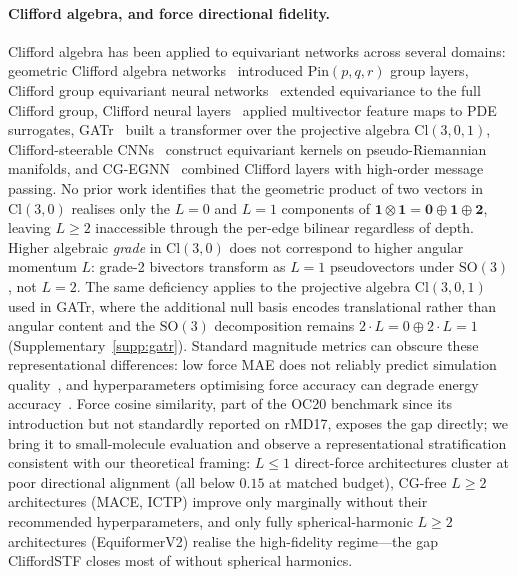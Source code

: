 \paragraph{Clifford algebra, and force directional fidelity.}
Clifford algebra has been applied to equivariant networks across several domains: geometric Clifford algebra networks~\citep{ruhe2023gcan} introduced $\mathrm{Pin}(p,q,r)$ group layers, Clifford group equivariant neural networks~\citep{ruhe2023cgenn} extended equivariance to the full Clifford group, Clifford neural layers~\citep{brandstetter2022clifford} applied multivector feature maps to PDE surrogates, GATr~\citep{brehmer2023geometric} built a transformer over the projective algebra $\mathrm{Cl}(3,0,1)$, Clifford-steerable CNNs~\citep{zhdanov2024clifford} construct equivariant kernels on pseudo-Riemannian manifolds, and CG-EGNN~\citep{tran2024cgegnn} combined Clifford layers with high-order message passing. No prior work identifies that the geometric product of two vectors in $\mathrm{Cl}(3,0)$ realises only the $L{=}0$ and $L{=}1$ components of $\mathbf{1}\otimes\mathbf{1} = \mathbf{0}\oplus\mathbf{1}\oplus\mathbf{2}$, leaving $L \geq 2$ inaccessible through the per-edge bilinear regardless of depth. Higher algebraic \emph{grade} in $\mathrm{Cl}(3,0)$ does not correspond to higher angular momentum $L$: grade-2 bivectors transform as $L{=}1$ pseudovectors under $\mathrm{SO}(3)$, not $L{=}2$. The same deficiency applies to the projective algebra $\mathrm{Cl}(3,0,1)$ used in GATr, where the additional null basis encodes translational rather than angular content and the $\mathrm{SO}(3)$ decomposition remains $2\cdot L{=}0 \oplus 2\cdot L{=}1$ (Supplementary~\ref{supp:gatr}). Standard magnitude metrics can obscure these representational differences: low force MAE does not reliably predict simulation quality~\citep{fu2023forces}, and hyperparameters optimising force accuracy can degrade energy accuracy~\citep{kovacs2023mace}. Force cosine similarity, part of the OC20 benchmark since its introduction but not standardly reported on rMD17, exposes the gap directly; we bring it to small-molecule evaluation and observe a representational stratification consistent with our theoretical framing: $L \leq 1$ direct-force architectures cluster at poor directional alignment (all below $0.15$ at matched budget), CG-free $L \geq 2$ architectures (MACE, ICTP) improve only marginally without their recommended hyperparameters, and only fully spherical-harmonic $L \geq 2$ architectures (EquiformerV2) realise the high-fidelity regime---the gap CliffordSTF closes most of without spherical harmonics.